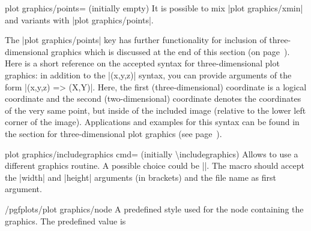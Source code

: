 {{\begin{pgfplotskey}{plot graphics/points= (initially empty)}
    It is possible to mix |plot graphics/xmin| and variants with
    |plot graphics/points|.

    The |plot graphics/points| key has further functionality for inclusion of
    three-dimensional graphics which is discussed at the end of this section
    (on page~\pageref{sec:plotgraphics3d}). Here is a short reference on the
    accepted syntax for three-dimensional plot graphics: in addition to the
    |(x,y,z)| syntax, you can provide arguments of the form |(x,y,z) => (X,Y)|.
    Here, the first (three-dimensional) coordinate is a logical coordinate and
    the second (two-dimensional) coordinate denotes the coordinates of the very
    same point, but inside of the included image (relative to the lower left
    corner of the image). Applications and examples for this syntax can be
    found in the section for three-dimensional plot graphics (see
    page~\pageref{sec:plotgraphics3d}).
\end{pgfplotskey}


\begin{pgfplotskey}{plot graphics/includegraphics cmd= (initially \textbackslash includegraphics)}
    Allows to use a different graphics routine. A possible choice could be
    |\pgfimage|. The macro should accept the |width| and |height| arguments (in
    brackets) and the file name as first argument.
\end{pgfplotskey}

\begin{stylekey}{/pgfplots/plot graphics/node}
    A predefined style used for the \Tikz{} node containing the graphics. The
    predefined value is
\begin{codeexample}
\end{codeexample}
\end{stylekey}

}}
